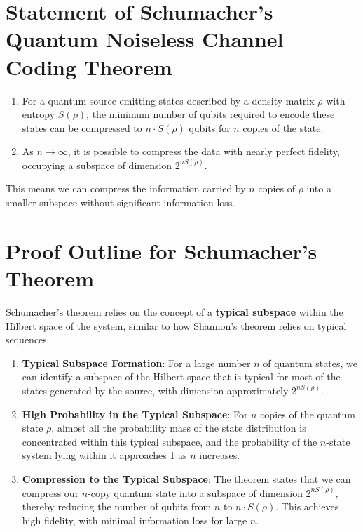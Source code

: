 \section{Statement of Schumacher’s Quantum Noiseless Channel Coding Theorem}

\begin{enumerate}
    \item For a quantum source emitting states described by a density matrix \( \rho \) with entropy \( S(\rho) \), the minimum number of qubits required to encode these states can be compressed to \( n \cdot S(\rho) \) qubits for \( n \) copies of the state.
    \item As \( n \to \infty \), it is possible to compress the data with nearly perfect fidelity, occupying a subspace of dimension \( 2^{n S(\rho)} \).
\end{enumerate}

This means we can compress the information carried by \( n \) copies of \( \rho \) into a smaller subspace without significant information loss.

\section{Proof Outline for Schumacher’s Theorem}

Schumacher’s theorem relies on the concept of a \textbf{typical subspace} within the Hilbert space of the system, similar to how Shannon's theorem relies on typical sequences.

\begin{enumerate}
    \item \textbf{Typical Subspace Formation}: For a large number \( n \) of quantum states, we can identify a subspace of the Hilbert space that is typical for most of the states generated by the source, with dimension approximately \( 2^{n S(\rho)} \).
    \item \textbf{High Probability in the Typical Subspace}: For \( n \) copies of the quantum state \( \rho \), almost all the probability mass of the state distribution is concentrated within this typical subspace, and the probability of the \( n \)-state system lying within it approaches 1 as \( n \) increases.
    \item \textbf{Compression to the Typical Subspace}: The theorem states that we can compress our \( n \)-copy quantum state into a subspace of dimension \( 2^{n S(\rho)} \), thereby reducing the number of qubits from \( n \) to \( n \cdot S(\rho) \). This achieves high fidelity, with minimal information loss for large \( n \).
\end{enumerate}

